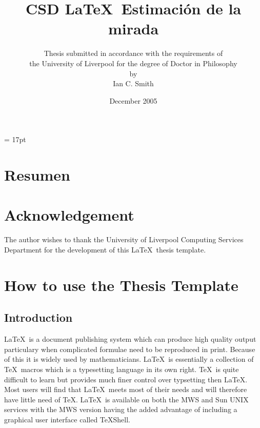 \documentclass[11pt,oneside]{book}
\begin{document}
\baselineskip = 17pt


\title{CSD \LaTeX \ Estimación de la mirada}
\author{Thesis submitted in accordance with the requirements of \\
the University of Liverpool for the degree of Doctor in Philosophy \\
by \\
Ian C. Smith}
\date{December 2005}
\maketitle 
\frontmatter

\chapter{Resumen}


\tableofcontents



\listoffigures





\chapter{Acknowledgement}

The author wishes to thank the University of
Liverpool Computing Services Department for the development of this
\LaTeX \ thesis template.

\printglossary






\mainmatter

\chapter{How to use the Thesis Template}
\section{Introduction}

\LaTeX \ is a document publishing system which can produce high quality 
output particulary when complicated formulae need to be reproduced in print.
Because of this it is widely used by mathematicians. \LaTeX \ is essentially
a collection of \TeX \ macros which is a typesetting language in its own right.
\TeX \ is quite difficult to learn but provides much finer control over typsetting
then \LaTeX. Most users will find that \LaTeX \ meets most of their
needs and will therefore have little need of \TeX. \LaTeX \ is available on 
both the MWS and Sun UNIX services with the MWS
version having the added advantage of including a graphical user interface called 
TeXShell.
\end{document}
